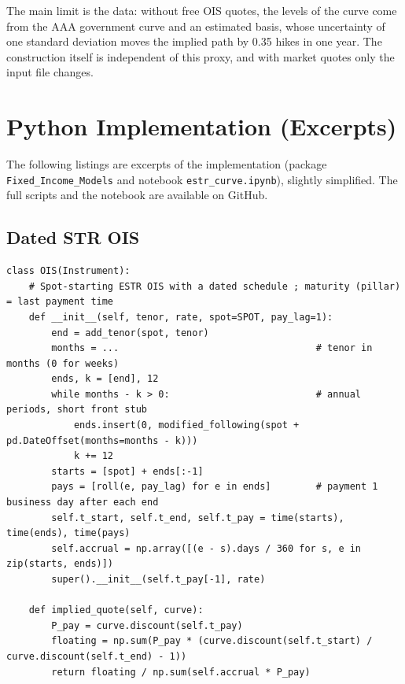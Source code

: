 \documentclass[11pt,a4paper]{article}
\theoremstyle{plain}
\theoremstyle{definition}
\begin{document}
The main limit is the data: without free OIS quotes, the levels of the curve come from the AAA government curve and an estimated basis, whose uncertainty of one standard deviation moves the implied path by 0.35 hikes in one year. The construction itself is independent of this proxy, and with market quotes only the input file changes.

\clearpage

\appendix
\section{Python Implementation (Excerpts)}
\label{app:code}

The following listings are excerpts of the implementation (package \texttt{Fixed\_Income\_Models} and notebook \texttt{estr\_curve.ipynb}), slightly simplified. The full scripts and the notebook are available on GitHub.

\subsection{Dated \texteuro STR OIS}
\begin{lstlisting}[style=pystyle]
class OIS(Instrument):
    # Spot-starting ESTR OIS with a dated schedule ; maturity (pillar) = last payment time
    def __init__(self, tenor, rate, spot=SPOT, pay_lag=1):
        end = add_tenor(spot, tenor)
        months = ...                                   # tenor in months (0 for weeks)
        ends, k = [end], 12
        while months - k > 0:                          # annual periods, short front stub
            ends.insert(0, modified_following(spot + pd.DateOffset(months=months - k)))
            k += 12
        starts = [spot] + ends[:-1]
        pays = [roll(e, pay_lag) for e in ends]        # payment 1 business day after each end
        self.t_start, self.t_end, self.t_pay = time(starts), time(ends), time(pays)
        self.accrual = np.array([(e - s).days / 360 for s, e in zip(starts, ends)])
        super().__init__(self.t_pay[-1], rate)

    def implied_quote(self, curve):
        P_pay = curve.discount(self.t_pay)
        floating = np.sum(P_pay * (curve.discount(self.t_start) / curve.discount(self.t_end) - 1))
        return floating / np.sum(self.accrual * P_pay)
\end{lstlisting}
\end{document}
